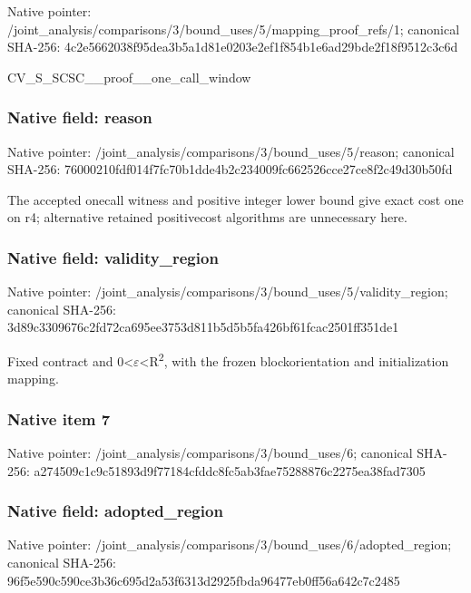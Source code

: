 \documentclass[10pt,a4paper]{article}
\begin{document}
Native pointer: /joint\_analysis/comparis\allowbreak{}ons/3/bound\_uses/5/mappi\allowbreak{}ng\_proof\_refs/1; canonical SHA-256: 4c2e5662038f95dea3b5a1d8\allowbreak{}1e0203e2ef1f854b1e6ad29b\allowbreak{}de2f18f9512c3c6d


CV\_S\_SCSC\_\_proof\_\_one\_call\_window


\subsubsection{Native field: reason}


Native pointer: /joint\_analysis/comparis\allowbreak{}ons/3/bound\_uses/5/reaso\allowbreak{}n; canonical SHA-256: 76000210fdf014f7fc70b1dd\allowbreak{}e4b2c234009fc662526cce27\allowbreak{}ce8f2c49d30b50fd


The accepted onecall witness and positive integer lower bound give exact cost one on r4; alternative retained positivecost algorithms are unnecessary here.


\subsubsection{Native field: validity\_region}


Native pointer: /joint\_analysis/comparis\allowbreak{}ons/3/bound\_uses/5/valid\allowbreak{}ity\_region; canonical SHA-256: 3d89c3309676c2fd72ca695e\allowbreak{}e3753d811b5d5b5fa426bf61\allowbreak{}fcac2501ff351de1


Fixed contract and 0<\ensuremath{\varepsilon}<R\textsuperscript{2}, with the frozen blockorientation and initialization mapping.


\subsubsection{Native item 7}


Native pointer: /joint\_analysis/comparis\allowbreak{}ons/3/bound\_uses/6; canonical SHA-256: a274509c1c9c51893d9f7718\allowbreak{}4cfddc8fc5ab3fae75288876\allowbreak{}c2275ea38fad7305



\subsubsection{Native field: adopted\_region}


Native pointer: /joint\_analysis/comparis\allowbreak{}ons/3/bound\_uses/6/adopt\allowbreak{}ed\_region; canonical SHA-256: 96f5e590c590ce3b36c695d2\allowbreak{}a53f6313d2925fbda96477eb\allowbreak{}0ff56a642c7c2485
\end{document}
